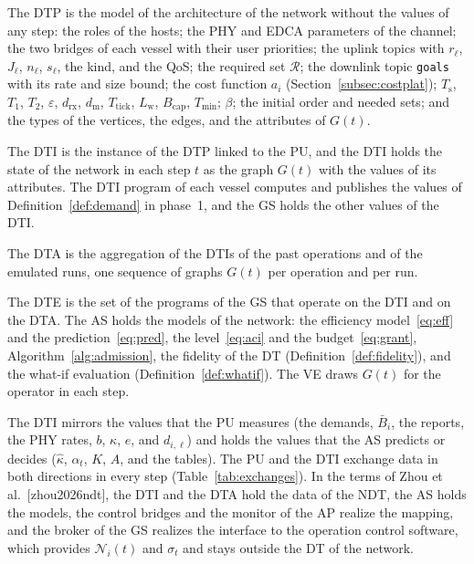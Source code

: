 \begin{definition}[DTP]\label{def:dtp}
The DTP is the model of the architecture of the network without the values of any step: the roles of the hosts; the PHY and EDCA parameters of the channel; the two bridges of each vessel with their user priorities; the uplink topics with $r_\ell$, $J_\ell$, $n_\ell$, $s_\ell$, the kind, and the QoS; the required set $\mathcal{R}$; the downlink topic \texttt{goals} with its rate and size bound; the cost function $a_i$ (Section~\ref{subsec:costplat}); $T_{\mathrm{s}}$, $T_1$, $T_2$, $\varepsilon$, $d_{\mathrm{rx}}$, $d_{\mathrm{m}}$, $T_{\mathrm{tick}}$, $L_{\mathrm{w}}$, $B_{\mathrm{cap}}$, $T_{\min}$; $\beta$; the initial order and needed sets; and the types of the vertices, the edges, and the attributes of $G(t)$.
\end{definition}

\begin{definition}[DTI]\label{def:dti}
The DTI is the instance of the DTP linked to the PU, and the DTI holds the state of the network in each step $t$ as the graph $G(t)$ with the values of its attributes. The DTI program of each vessel computes and publishes the values of Definition~\ref{def:demand} in phase~1, and the GS holds the other values of the DTI.
\end{definition}

\begin{definition}[DTA]\label{def:dta}
The DTA is the aggregation of the DTIs of the past operations and of the emulated runs, one sequence of graphs $G(t)$ per operation and per run.
\end{definition}

\begin{definition}[DTE]\label{def:dte}
The DTE is the set of the programs of the GS that operate on the DTI and on the DTA. The AS holds the models of the network: the efficiency model~\eqref{eq:eff} and the prediction~\eqref{eq:pred}, the level~\eqref{eq:aci} and the budget~\eqref{eq:grant}, Algorithm~\ref{alg:admission}, the fidelity of the DT (Definition~\ref{def:fidelity}), and the what-if evaluation (Definition~\ref{def:whatif}). The VE draws $G(t)$ for the operator in each step.
\end{definition}

The DTI mirrors the values that the PU measures (the demands, $\bar{B}_i$, the reports, the PHY rates, $b$, $\kappa$, $e$, and $d_{i,\ell}$) and holds the values that the AS predicts or decides ($\hat{\kappa}$, $\alpha_t$, $K$, $A$, and the tables). The PU and the DTI exchange data in both directions in every step (Table~\ref{tab:exchanges}). In the terms of Zhou et al.~[zhou2026ndt], the DTI and the DTA hold the data of the NDT, the AS holds the models, the control bridges and the monitor of the AP realize the mapping, and the broker of the GS realizes the interface to the operation control software, which provides $\mathcal{N}_i(t)$ and $\sigma_t$ and stays outside the DT of the network.

